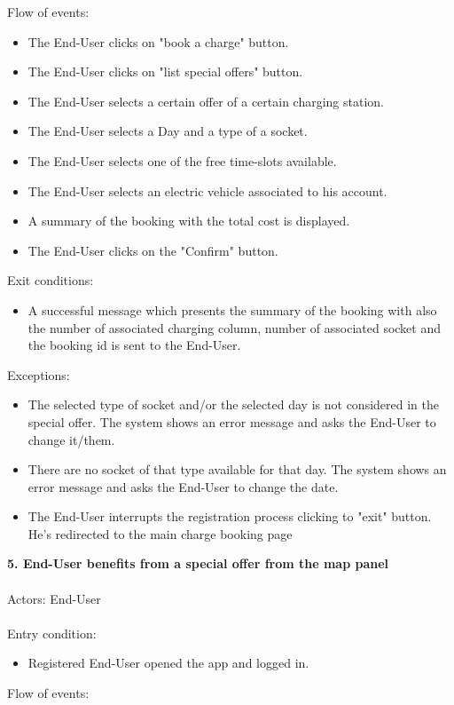 \documentclass[a4paper]{report}
\begin{document}
Flow of events:
\begin{itemize}
\item The End-User clicks on "book a charge" button.
\item The End-User clicks on "list special offers" button.
\item The End-User selects a certain offer of a certain charging station.
\item The End-User selects a Day and a type of a socket.
\item The End-User selects one of the free time-slots available.
\item The End-User selects an electric vehicle associated to his account.
\item A summary of the booking with the total cost is displayed.
\item The End-User clicks on the "Confirm" button.
\end{itemize}
Exit conditions:
\begin{itemize}
\item A successful message which presents the summary of the booking with also the number of associated charging column, number of associated socket and the booking id is sent to the End-User.
 \end{itemize}
Exceptions: 
 \begin{itemize}
 \item The selected type of socket and/or the selected day is not considered in the special offer. The system shows an error message and asks the End-User to change it/them.
 \item There are no socket of that type available for that day. The system shows an error message and asks the End-User to change the date.
 \item The End-User interrupts the registration process clicking to "exit" button. He's redirected to the main charge booking page
\end{itemize}
\textbf{5. End-User benefits from a special offer from the map panel}\label{uc:6}
\\ \\
Actors: End-User \\ \\
Entry condition:
\begin{itemize}
\item Registered End-User opened the app and logged in.
\end{itemize}
Flow of events:
\end{document}
